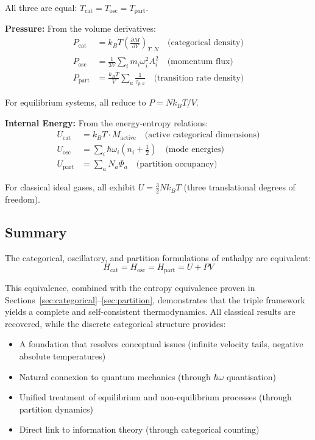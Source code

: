 All three are equal: $T_{\text{cat}} = T_{\text{osc}} = T_{\text{part}}$.

\textbf{Pressure:} From the volume derivatives:
\begin{align}
P_{\text{cat}} &= k_B T \left(\frac{\partial M}{\partial V}\right)_{T,N} \quad \text{(categorical density)} \\
P_{\text{osc}} &= \frac{1}{3V}\sum_i m_i \omega_i^2 A_i^2 \quad \text{(momentum flux)} \\
P_{\text{part}} &= \frac{k_B T}{V} \sum_a \frac{1}{\tau_{p,a}} \quad \text{(transition rate density)}
\end{align}

For equilibrium systems, all reduce to $P = Nk_B T/V$.

\textbf{Internal Energy:} From the energy-entropy relations:
\begin{align}
U_{\text{cat}} &= k_B T \cdot M_{\text{active}} \quad \text{(active categorical dimensions)} \\
U_{\text{osc}} &= \sum_i \hbar\omega_i \left(n_i + \frac{1}{2}\right) \quad \text{(mode energies)} \\
U_{\text{part}} &= \sum_a N_a \Phi_a \quad \text{(partition occupancy)}
\end{align}

For classical ideal gases, all exhibit $U = \frac{3}{2}Nk_B T$ (three translational degrees of freedom).

\subsection{Summary}

The categorical, oscillatory, and partition formulations of enthalpy are equivalent:
\begin{equation}
H_{\text{cat}} = H_{\text{osc}} = H_{\text{part}} = U + PV
\end{equation}

This equivalence, combined with the entropy equivalence proven in Sections~\ref{sec:categorical}--\ref{sec:partition}, demonstrates that the triple framework yields a complete and self-consistent thermodynamics. All classical results are recovered, while the discrete categorical structure provides:
\begin{itemize}
\item A foundation that resolves conceptual issues (infinite velocity tails, negative absolute temperatures)
\item Natural connexion to quantum mechanics (through $\hbar\omega$ quantisation)
\item Unified treatment of equilibrium and non-equilibrium processes (through partition dynamics)
\item Direct link to information theory (through categorical counting)
\end{itemize}

